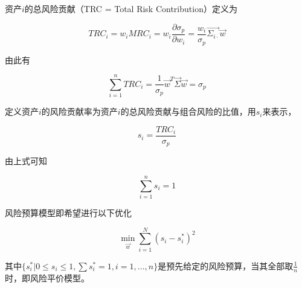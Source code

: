 资产$i$的总风险贡献（TRC = Total Risk Contribution）定义为

\begin{equation}
    TRC_i = w_iMRC_i =w_i\frac{\partial \sigma_p}{\partial w_i} =\frac{w_i}{\sigma_p}\vec{\Sigma_{i\cdot}}\vec{w}
\end{equation}

由此有

\begin{equation}
    \sum_{i=1}^nTRC_i = \frac{1}{\sigma_p}\vec{w}^T\vec{\Sigma}\vec{w} = \sigma_p
\end{equation}

定义资产$i$的风险贡献率为资产$i$的总风险贡献与组合风险的比值，用$s_i$来表示，

\begin{equation}
    s_i = \frac{TRC_i}{\sigma_p}
\end{equation}

由上式可知

\begin{equation}
    \sum_{i=1}^n s_i=1
\end{equation}

风险预算模型即希望进行以下优化

\begin{equation}
    \min_{\vec{w}}\sum_{i=1}^N(s_i-s_i^*)^2
\end{equation}

其中$\{s_i^*|0\leq s_i\leq 1, \sum s_i^*=1, i=1,...,n\}$是预先给定的风险预算，当其全部取$\frac{1}{n}$时，即风险平价模型。
